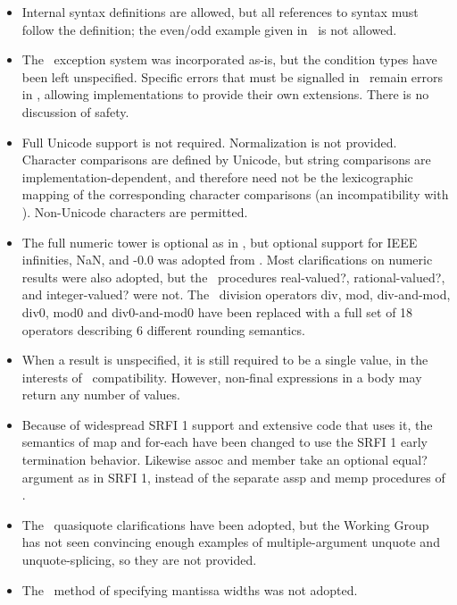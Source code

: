 \begin{itemize}
\item Internal syntax definitions are allowed, but all references to syntax
must follow the definition; the {\cf even}/{\cf odd} example given in
\rsixrs\ is not allowed.

\item The \rsixrs\ exception system was incorporated as-is, but the condition
types have been left unspecified.  Specific errors that must be signalled
in \rsixrs\ remain errors in \rsevenrs, allowing implementations to provide
their own extensions.  There is no discussion of safety.

\item Full Unicode support is not required.
Normalization is not provided.
Character comparisons are
defined by Unicode, but string comparisons are implementation-dependent,
and therefore need not be the lexicographic mapping of the corresponding
character comparisons (an incompatibility with \rfivers). Non-Unicode
characters are permitted.

\item The full numeric tower is optional as in \rfivers, but optional support for IEEE
infinities, NaN, and {\mbox -0.0} was adopted from \rsixrs. Most clarifications on
numeric results were also adopted, but the \rsixrs\ procedures {\cf real-valued?},
{\cf rational-valued?}, and {\cf integer-valued}? were not. 
The \rsixrs\ division operators {\cf div}, {\cf mod}, {\cf div-and-mod}, {\cf
div0}, {\cf mod0} and {\cf div0-and-mod0} have been replaced with a full
set of 18 operators describing 6 different rounding semantics.

\item When a result is unspecified, it is still required to be a single value,
in the interests of \rfivers\ compatibility. However, non-final expressions
in a body may return any number of values.

\item Because of widespread SRFI 1 support and extensive code
that uses it, the semantics of {\cf map} and {\cf for-each} have been changed to use
the SRFI 1 early termination behavior. Likewise
{\cf assoc} and {\cf member} take an optional {\cf equal?} argument as in SRFI 1,
instead of the separate {\cf assp} and {\cf memp} procedures of \rsixrs.

\item The \rsixrs~{\cf quasiquote} clarifications have been adopted, but the Working Group has not seen
convincing enough examples of multiple-argument {\cf unquote} and
{\cf unquote-splicing}, so they are not provided.

\item The \rsixrs~method of specifying mantissa widths was not adopted.

\end{itemize}

